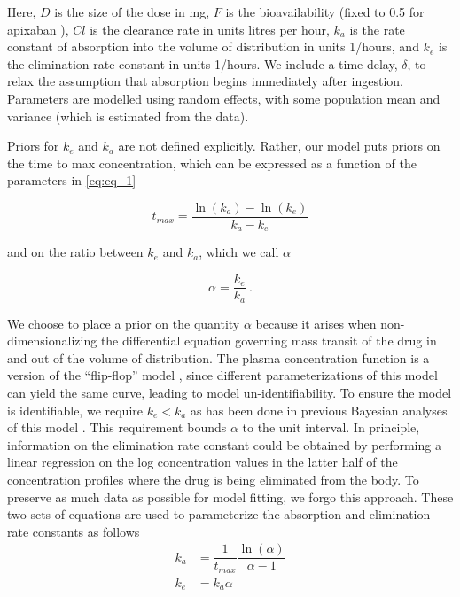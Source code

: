 \noindent Here, $D$ is the size of the dose in mg, $F$ is the bioavailability (fixed to 0.5 for apixaban \cite{Byon2019-gf}), $\mathit{Cl}$ is the clearance rate in units litres per hour, $k_a$ is the rate constant of absorption into the volume of distribution in units 1/hours, and $k_e$ is the elimination rate constant in units 1/hours. We include a time delay, $\delta$, to relax the assumption that absorption begins immediately after ingestion.  Parameters are modelled using random effects, with some population mean and variance (which is estimated from the data). 

Priors for $k_e$ and $k_a$ are not defined explicitly.  Rather, our model puts priors on the time to max concentration, which can be expressed as a function of the parameters in \cref{eq:eq_1}

\begin{equation}\label{eq:eq_2}
 t_{\mathit{max}} = \dfrac{\ln(k_a) - \ln(k_e)}{k_a - k_e}
\end{equation}

\noindent and on the ratio between $k_e$ and $k_a$, which we call $\alpha$

\begin{equation}\label{eq:eq_3}
\alpha  = \dfrac{k_e}{k_a} \>.
\end{equation}

\noindent We choose to place a prior on the quantity $\alpha$ because it arises when non-dimensionalizing \cite{holmes2009introduction} the differential equation governing mass transit of the drug in and out of the volume of distribution.  The plasma concentration function is a version of the “flip-flop” model \cite{Wakefield1996-yy, Salway2008-gi}, since different parameterizations of this model can yield the same curve, leading to model un-identifiability. To ensure the model is identifiable, we require $k_e<k_a$ as has been done in previous Bayesian analyses of this model \cite{Wakefield1996-yy, Salway2008-gi}. This requirement bounds $\alpha$ to the unit interval.  In principle, information on the elimination rate constant could be obtained by performing a linear regression on the log concentration values in the latter half of the concentration profiles where the drug is being eliminated from the body. To preserve as much data as possible for model fitting, we forgo this approach.  These two sets of equations are used to parameterize the absorption and elimination rate constants as follows
\begin{align}
	k_a &= \dfrac{1}{t_{\mathit{max}}} \dfrac{\ln(\alpha)}{\alpha-1} \label{eq:eq_4} \\
	k_e &= k_a \alpha \label{eq:eq_5}
\end{align}

